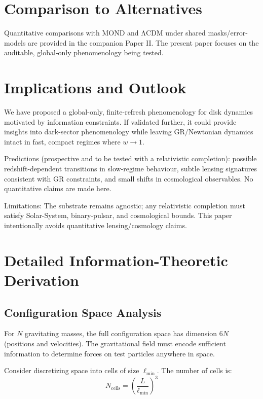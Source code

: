 \documentclass[usenatbib]{mnras}
\begin{document}
\section{Comparison to Alternatives}

Quantitative comparisons with MOND and ΛCDM under shared masks/error-models are provided in the companion Paper II. The present paper focuses on the auditable, global-only phenomenology being tested.

\section{Implications and Outlook}
\label{sec:conclusion}

We have proposed a global-only, finite-refresh phenomenology for disk dynamics motivated by information constraints. If validated further, it could provide insights into dark-sector phenomenology while leaving GR/Newtonian dynamics intact in fast, compact regimes where $w\to 1$.

Predictions (prospective and to be tested with a relativistic completion): possible redshift-dependent transitions in slow-regime behaviour, subtle lensing signatures consistent with GR constraints, and small shifts in cosmological observables. No quantitative claims are made here.

Limitations: The substrate remains agnostic; any relativistic completion must satisfy Solar-System, binary-pulsar, and cosmological bounds. This paper intentionally avoids quantitative lensing/cosmology claims.

\appendix

\section{Detailed Information-Theoretic Derivation}

\subsection{Configuration Space Analysis}

For $N$ gravitating masses, the full configuration space has dimension $6N$ (positions and velocities). The gravitational field must encode sufficient information to determine forces on test particles anywhere in space.

Consider discretizing space into cells of size $\ell_{\text{min}}$. The number of cells is:
\begin{equation}
N_{\text{cells}} = \left(\frac{L}{\ell_{\text{min}}}\right)^3
\end{equation}
\end{document}
